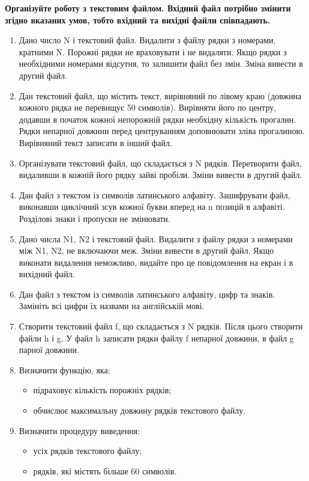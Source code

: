 \documentclass[]{article}
\makeatletter
\newcommand{\xslalph}[1]{\expandafter\@xslalph\csname c@#1\endcsname}
\newcommand{\@xslalph}[1]{%
    \ifcase#1\or а\or б\or в\or г\or д\or e\or є\or ж\or з\or i%
    \or й\or к\or л\or м\or н\or о\or п\or р\or с\or т%
    \or у\or ф\or х\or ц\or ч\or ш\or ю\or я\or аа\or бб\or вв%
    \else\@ctrerr\fi%
}
\makeatother
\begin{document}
\begin{enumerate}
\begin{enumerate}[label=\xslalph*)]
\begin{enumerate}
\begin{enumerate}[label=\xslalph*)]
\textbf{Організуйте роботу з текстовим файлом. Вхідний файл потрібно
змінити згідно вказаних умов, тобто вхідний та вихідні файли
співпадають.}

\begin{enumerate}
\def\labelenumi{\arabic{enumi})}
\setcounter{enumi}{12}
\item
  Дано число N і текстовий файл. Видалити з файлу рядки з номерами,
  кратними N. Порожні рядки не враховувати і не видаляти. Якщо рядки з
  необхідними номерами відсутня, то залишити файл без змін. Зміна
  вивести в другий файл.
\item
  Дан текстовий файл, що містить текст, вирівняний по лівому краю
  (довжина кожного рядка не перевищує 50 символів). Вирівняти його по
  центру, додавши в початок кожної непорожній рядки необхідну кількість
  прогалин. Рядки непарної довжини перед центруванням доповнювати зліва
  прогалиною. Вирівняний текст записати в інший файл.
\item
  Організувати текстовий файл, що складається з N рядків. Перетворити
  файл, видаливши в кожній його рядку зайві пробіли. Зміни вивести в
  другий файл.
\item
  Дан файл з текстом із символів латинського алфавіту. Зашифрувати файл,
  виконавши циклічний зсув кожної букви вперед на n позицій в алфавіті.
  Розділові знаки і пропуски не змінювати.
\item
  Дано числа N1, N2 і текстовий файл. Видалити з файлу рядки з номерами
  між N1, N2, не включаючи меж. Зміни вивести в другий файл. Якщо
  виконати видалення неможливо, видайте про це повідомлення на екран і в
  вихідний файл.
\item
  Дан файл з текстом із символів латинського алфавіту, цифр та знаків.
  Замініть всі цифри їх назвами на англійській мові.
\item
  Створити текстовий файл f, що складається з N рядків. Після цього
  створити файли h і g. У файл h записати рядки файлу f непарної
  довжини, в файл g парної довжини.

\item
 Визначити функцію, яка:
\begin{itemize}
\item підраховує кількість порожніх рядків;
\item обчислює максимальну довжину рядків текстового файлу.
\end{itemize}

\item Визначити процедуру виведення:
\begin{itemize}
\item усіх рядків текстового файлу;
\item рядків, які містять більше 60 символів.
\end{itemize}


\end{enumerate}
\end{enumerate}
\end{enumerate}
\end{enumerate}
\end{enumerate}
\end{document}
